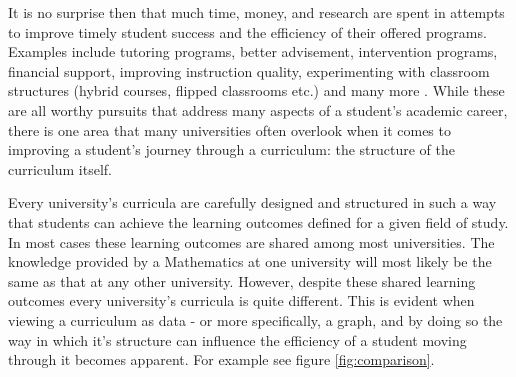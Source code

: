 \documentclass[botnum, fleqn]{unmeethesis}
\begin{document}
  It is no surprise then that much time, money, and research are spent in attempts to improve timely student success and the efficiency of their offered programs. Examples include tutoring programs, better advisement, intervention programs, financial support, improving instruction quality, experimenting with classroom structures (hybrid courses, flipped classrooms etc.) and many more \cite{o2015use,topping1996effectiveness,hunter2004could,king2002identifying,lewallen1993early}. While these are all worthy pursuits that address many aspects of a student's academic career, there is one area that many universities often overlook when it comes to improving a student's journey through a curriculum: the structure of the curriculum itself.

  Every university's curricula are carefully designed and structured in such a way that students can achieve the learning outcomes defined for a given field of study. In most cases these learning outcomes are shared among most universities. The knowledge provided by a Mathematics at one university will most likely be the same as that at any other university. However, despite these shared learning outcomes every university's curricula is quite different. This is evident when viewing a curriculum as data - or more specifically, a graph, and by doing so the way in which it's structure can influence the efficiency of a student moving through it becomes apparent. For example see figure \ref{fig:comparison}.
\end{document}
